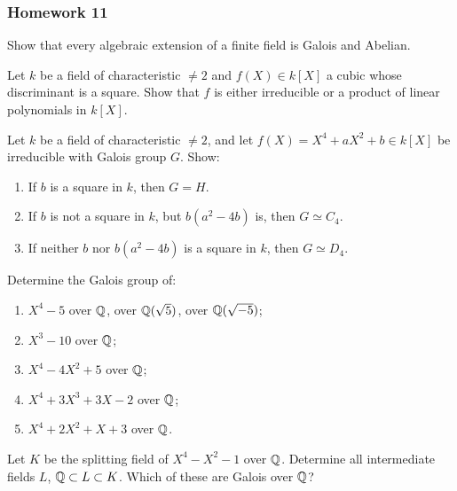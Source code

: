\subsubsection{Homework 11}
\setcounter{exercise}{0}

\begin{problem}
  Show that every algebraic extension of a finite field is Galois and
  Abelian.
\end{problem}
\begin{solution}
\end{solution}

\begin{problem}
  Let $k$ be a field of characteristic $\neq 2$ and $f(X)\in k[X]$ a
  cubic whose discriminant is a square. Show that $f$ is either irreducible
  or a product of linear polynomials in $k[X]$.
\end{problem}
\begin{solution}
\end{solution}

\begin{problem}
  Let $k$ be a field of characteristic $\neq 2$, and let
  $f(X)=X^4+aX^2+b\in k[X]$ be irreducible with Galois group $G$. Show:
  \begin{enumerate}[label=(\roman*),noitemsep]
  \item If $b$ is a square in $k$, then $G=H$.
  \item If $b$ is not a square in $k$, but $b(a^2-4b)$ is, then
    $G\simeq C_4$.
  \item If neither $b$ nor $b(a^2-4b)$ is a square in $k$, then
    $G\simeq D_4$.
  \end{enumerate}
\end{problem}
\begin{solution}
\end{solution}

\begin{problem}
  Determine the Galois group of:
  \begin{enumerate}[label=(\alph*),noitemsep]
  \item $X^4-5$ over $\mathbb{Q}$, over $\mathbb{Q}(\sqrt{5})$, over $\mathbb{Q}(\sqrt{-5})$;
  \item $X^3-10$ over $\mathbb{Q}$;
  \item $X^4-4X^2+5$ over $\mathbb{Q}$;
  \item $X^4+3X^3+3X-2$ over $\mathbb{Q}$;
  \item $X^4+2X^2+X+3$ over $\mathbb{Q}$.
  \end{enumerate}
\end{problem}
\begin{solution}
\end{solution}

\begin{problem}
  Let $K$ be the splitting field of $X^4-X^2-1$ over $\mathbb{Q}$. Determine
  all intermediate fields $L$, $\mathbb{Q}\subset L\subset K$. Which of
  these are Galois over $\mathbb{Q}$?
\end{problem}
\begin{solution}
\end{solution}

